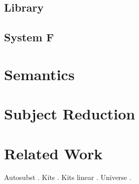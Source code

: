 \documentclass[sigplan,10pt]{acmart}
\newenvironment{LibCode*}{%
  \begin{tcolorbox}[%
    colframe=white,%
    boxrule=0.0pt,%
    top=2.5pt,%
    left=2.5pt,%
    bottom=2.5pt,%
    right=2.5pt,%
    boxsep=0pt%
  ]\vspace{-0.2\baselineskip}%
}{%
  \vspace{-1\baselineskip}%
  \end{tcolorbox}%
}
\newcommand*\LibCode[1]{\begin{LibCode*}{#1}\end{LibCode*}}
\newcommand*\AppCode[1]{{#1}}
\begin{document}
  \subsection{Library}
  \LibCode\KVariableTyping
  \LibCode\KTyping
  \LibCode\KTypingKit
  \LibCode\KMapTyping
  \LibCode\KLiftTyping
  \LibCode\KSingleTyping
  \LibCode\KTypingNotation
  \LibCode\KTypingTraversal
  \LibCode\KTypingInstances
  \subsection{System F}
  \AppCode\FTyping
  \AppCode\FTypingInst
  \AppCode\FPreserve
  \AppCode\FTypingTraversal

  \section{Semantics}
  \AppCode\FReduction

  \section{Subject Reduction}
  \AppCode\FSubjectReduction
  \AppCode\FSubjectReductionProofInteresting

  \section{Related Work}
  Autosubst \cite{DBLP:conf/cpp/StarkSK19, DBLP:conf/itp/SchaferTS15}.
  Kits \cite{DBLP:journals/jar/BentonHKM12, unpublished:mcbride2005kits}.
  Kits linear \cite{DBLP:journals/corr/abs-2005-02247}.
  Universe \cite{DBLP:journals/pacmpl/AllaisA0MM18}.

  

  \clearpage
  \appendix
\end{document}
